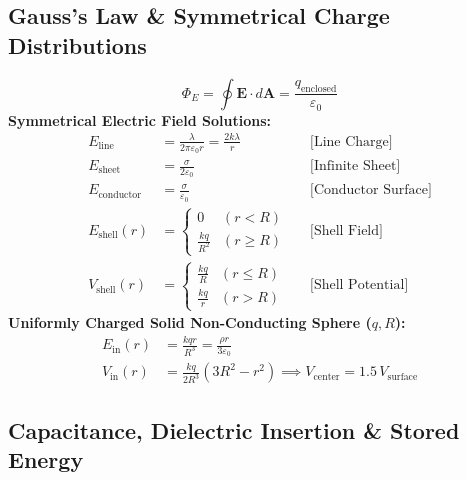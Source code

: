 \documentclass[10pt,twoside,openright]{book}
\begin{document}
\subsection{Gauss's Law \& Symmetrical Charge Distributions}

\begin{formulabox}
\begin{equation}
  \Phi_E = \oint \mathbf{E}\cdot d\mathbf{A} = \frac{q_{\text{enclosed}}}{\varepsilon_0}
\end{equation}
\textbf{Symmetrical Electric Field Solutions:}
\begin{align}
  E_{\text{line}} &= \frac{\lambda}{2\pi\varepsilon_0 r} = \frac{2k\lambda}{r} && \text{[Line Charge]} \\
  E_{\text{sheet}} &= \frac{\sigma}{2\varepsilon_0} && \text{[Infinite Sheet]} \\
  E_{\text{conductor}} &= \frac{\sigma}{\varepsilon_0} && \text{[Conductor Surface]} \\
  E_{\text{shell}}(r) &= \begin{cases} 0 & (r < R) \\ \frac{kq}{R^2} & (r \ge R) \end{cases} && \text{[Shell Field]} \\
  V_{\text{shell}}(r) &= \begin{cases} \frac{kq}{R} & (r \le R) \\ \frac{kq}{r} & (r > R) \end{cases} && \text{[Shell Potential]}
\end{align}
\textbf{Uniformly Charged Solid Non-Conducting Sphere ($q, R$):}
\begin{align}
  E_{\text{in}}(r) &= \frac{k q r}{R^3} = \frac{\rho r}{3\varepsilon_0} \\
  V_{\text{in}}(r) &= \frac{kq}{2R^3}(3R^2 - r^2) \implies V_{\text{center}} = 1.5\,V_{\text{surface}}
\end{align}
\end{formulabox}

\subsection{Capacitance, Dielectric Insertion \& Stored Energy}
\end{document}
